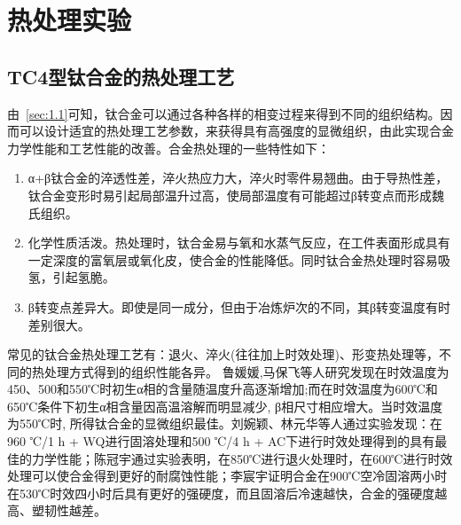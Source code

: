 \chapter{热处理实验}
\section{TC4型钛合金的热处理工艺}
由~\ref{sec:1.1}可知，钛合金可以通过各种各样的相变过程来得到不同的组织结构。因而可以设计适宜的热处理工艺参数，来获得具有高强度的显微组织，由此实现\ti 合金力学性能和工艺性能的改善。\ti 合金热处理的一些特性如下：
\begin{enumerate}
	\item α+β钛合金的淬透性差，淬火热应力大，淬火时零件易翘曲。由于导热性差，钛合金变形时易引起局部温升过高，使局部温度有可能超过β转变点而形成魏氏组织。
	\item 化学性质活泼。热处理时，钛合金易与氧和水蒸气反应，在工件表面形成具有一定深度的富氧层或氧化皮，使合金的性能降低。同时钛合金热处理时容易吸氢，引起氢脆。
	\item β转变点差异大。即使是同一成分，但由于冶炼炉次的不同，其β转变温度有时差别很大。
\end{enumerate}

常见的\ti 钛合金热处理工艺有：退火、淬火(往往加上时效处理)、形变热处理等，不同的热处理方式得到的组织性能各异。 鲁媛媛,马保飞等人研究发现在时效温度为450、500和550℃时初生α相的含量随温度升高逐渐增加;而在时效温度为600℃和650℃条件下初生α相含量因高温溶解而明显减少, β相尺寸相应增大。当时效温度为550℃时, 所得钛合金的显微组织最佳\cite{timing}。刘婉颖、林元华等人通过实验发现：在960 ℃/1 h + WQ进行固溶处理和500 ℃/4 h + AC下进行时效处理得到的\ti 具有最佳的力学性能\cite{960500}；陈冠宇通过实验表明，在850℃进行退火处理时，在600℃进行时效处理可以使合金得到更好的耐腐蚀性能\cite{1200}；李宸宇证明\ti 合金在900℃空冷固溶两小时在530℃时效四小时后具有更好的强硬度，而且固溶后冷速越快，合金的强硬度越高、塑韧性越差\cite{900}。%



